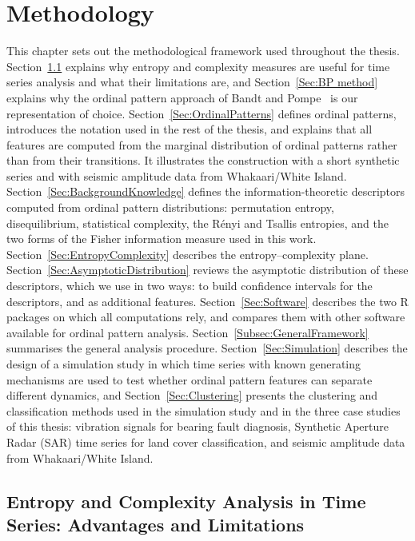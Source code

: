 \chapter{Methodology}\label{C:aim}

This chapter sets out the methodological framework used throughout the thesis. Section~\ref{Sec:AdvantagesLimitations} explains why entropy and complexity measures are useful for time series analysis and what their limitations are, and Section~\ref{Sec:BP method} explains why the ordinal pattern approach of Bandt and Pompe~\cite{PhysRevLett.88.174102} is our representation of choice. Section~\ref{Sec:OrdinalPatterns} defines ordinal patterns, introduces the notation used in the rest of the thesis, and explains that all features are computed from the marginal distribution of ordinal patterns rather than from their transitions. It illustrates the construction with a short synthetic series and with seismic amplitude data from Whakaari/White Island. Section~\ref{Sec:BackgroundKnowledge} defines the information-theoretic descriptors computed from ordinal pattern distributions: permutation entropy, disequilibrium, statistical complexity, the R\'enyi and Tsallis entropies, and the two forms of the Fisher information measure used in this work. Section~\ref{Sec:EntropyComplexity} describes the entropy--complexity plane. Section~\ref{Sec:AsymptoticDistribution} reviews the asymptotic distribution of these descriptors, which we use in two ways: to build confidence intervals for the descriptors, and as additional features. Section~\ref{Sec:Software} describes the two R packages on which all computations rely, and compares them with other software available for ordinal pattern analysis. Section~\ref{Subsec:GeneralFramework} summarises the general analysis procedure. Section~\ref{Sec:Simulation} describes the design of a simulation study in which time series with known generating mechanisms are used to test whether ordinal pattern features can separate different dynamics, and Section~\ref{Sec:Clustering} presents the clustering and classification methods used in the simulation study and in the three case studies of this thesis: vibration signals for bearing fault diagnosis, Synthetic Aperture Radar (SAR) time series for land cover classification, and seismic amplitude data from Whakaari/White Island.

\section{Entropy and Complexity Analysis in Time Series: Advantages and Limitations}\label{Sec:AdvantagesLimitations}

